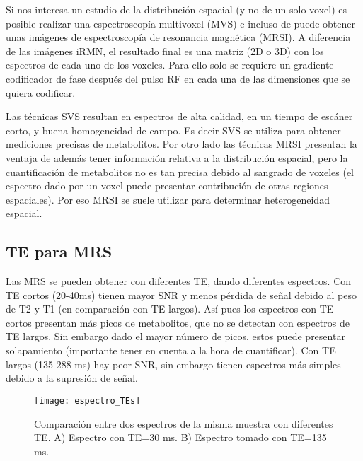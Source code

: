 Si nos interesa un estudio de la distribución espacial (y no de un solo voxel) es posible realizar una espectroscopía multivoxel (MVS) e incluso de puede obtener unas imágenes de espectroscopía de resonancia magnética (MRSI). A diferencia de las imágenes iRMN, el resultado final es una matriz (2D o 3D) con los espectros de cada uno de los voxeles. Para ello solo se requiere un gradiente codificador de fase después del pulso RF en cada una de las dimensiones que se quiera codificar.

Las técnicas SVS resultan en espectros de alta calidad, en un tiempo de escáner corto, y buena homogeneidad de campo. Es decir SVS se utiliza para obtener mediciones precisas de metabolitos. Por otro lado las técnicas MRSI presentan la ventaja de además tener información relativa a la distribución espacial, pero la cuantificación de metabolitos no es tan precisa debido al sangrado de voxeles (el espectro dado por un voxel puede presentar contribución de otras regiones espaciales). Por eso MRSI se suele utilizar para determinar heterogeneidad espacial.



\subsection{TE para MRS}
Las MRS se pueden obtener con diferentes TE, dando diferentes espectros.
Con TE cortos (20-40ms) tienen mayor SNR y menos pérdida de señal debido al peso de T2 y T1 (en comparación con TE largos). Así pues los espectros con TE cortos presentan más picos de metabolitos, que no se detectan con espectros de TE largos. Sin embargo dado el mayor número de picos, estos puede presentar solapamiento (importante tener en cuenta a la hora de cuantificar).
Con TE largos (135-288 ms) hay peor SNR, sin embargo tienen espectros más simples debido a la supresión de señal. 


\begin{figure}[htb]
 \begin{figg}
   \texttt{[image: espectro\_TEs]}
   \caption{Comparación entre dos espectros de la misma muestra con diferentes TE. A) Espectro con TE=30 ms. B) Espectro tomado con TE=135 ms.}
 \label{fig:espectro_TEs}
 \end{figg}
\end{figure}






